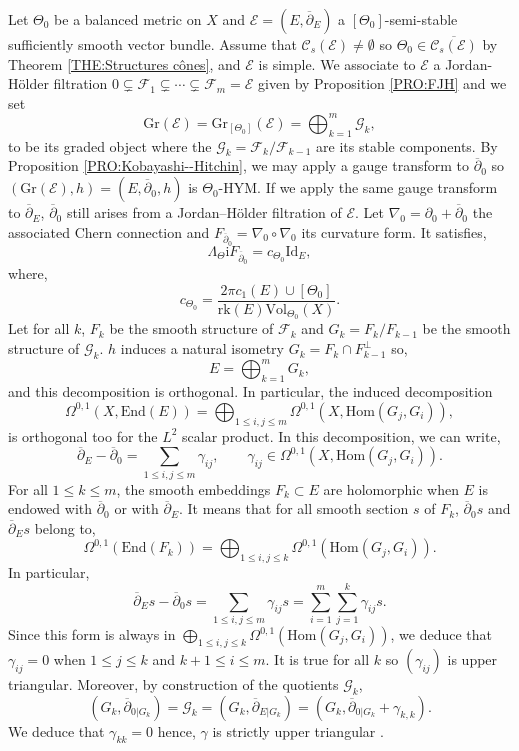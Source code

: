 \documentclass{article}
\theoremstyle{remark}
\theoremstyle{definition}
\newcommand{\rk}{\mathrm{rk}}
\newcommand{\Hom}{\mathrm{Hom}}
\newcommand{\End}{\mathrm{End}}
\newcommand{\Vol}{\mathrm{Vol}}
\newcommand{\Id}{\mathrm{Id}}
\renewcommand{\i}{\boldsymbol{\mathrm{i}}}
\newcommand{\E}{\mathcal{E}}
\newcommand{\F}{\mathcal{F}}
\newcommand{\G}{\mathcal{G}}
\newcommand{\Gr}{\mathrm{Gr}}
\newcommand{\dbar}{\overline{\partial}}
\newcommand{\mC}{\mathcal{C}}
\renewcommand{\leq}{\leqslant}
\begin{document}
Let $\Theta_0$ be a balanced metric on $X$ and $\E = (E,\dbar_E)$ a $[\Theta_0]$-semi-stable sufficiently smooth vector bundle. Assume that $\mC_s(\E) \neq \emptyset$ so $\Theta_0 \in \overline{\mC_s(\E)}$ by Theorem \ref{THE:Structures cônes}, and $\E$ is simple. We associate to $\E$ a Jordan-Hölder filtration $0 \subsetneq \F_1 \subsetneq \cdots \subsetneq \F_m = \E$ given by Proposition \ref{PRO:FJH} and we set
$$
\Gr(\E) = \Gr_{[\Theta_0]}(\E) = \bigoplus_{k = 1}^m \G_k,
$$
to be its graded object where the $\G_k = \F_k/\F_{k - 1}$ are its stable components. By Proposition \ref{PRO:Kobayashi--Hitchin}, we may apply a gauge transform to $\dbar_0$ so $(\Gr(\E),h) = (E,\dbar_0,h)$ is $\Theta_0$-HYM. If we apply the same gauge transform to $\dbar_E$, $\dbar_0$ still arises from a Jordan--Hölder filtration of $\E$. Let $\nabla_0 = \partial_0 + \dbar_0$ the associated Chern connection and $F_{\dbar_0} = \nabla_0 \circ \nabla_0$ its curvature form. It satisfies,
\begin{equation}\label{EQ:dbar_0 HYM}
    \Lambda_\Theta\i F_{\dbar_0} = c_{\Theta_0}\Id_E,
\end{equation}
where,
$$
c_{\Theta_0} = \frac{2\pi c_1(E) \cup [\Theta_0]}{\rk(E)\Vol_{\Theta_0}(X)}.
$$
Let for all $k$, $F_k$ be the smooth structure of $\F_k$ and $G_k = F_k/F_{k - 1}$ be the smooth structure of $\G_k$. $h$ induces a natural isometry $G_k = F_k \cap F_{k - 1}^\bot$ so,
$$
E = \bigoplus_{k = 1}^m G_k,
$$
and this decomposition is orthogonal. In particular, the induced decomposition
$$
\Omega^{0,1}(X,\End(E)) = \bigoplus_{1 \leq i,j \leq m} \Omega^{0,1}(X,\Hom(G_j,G_i)),
$$
is orthogonal too for the $L^2$ scalar product. In this decomposition, we can write,
$$
\dbar_E - \dbar_0 = \sum_{1 \leq i,j \leq m} \gamma_{ij}, \qquad \gamma_{ij} \in \Omega^{0,1}(X,\Hom(G_j,G_i)).
$$
For all $1 \leq k \leq m$, the smooth embeddings $F_k \subset E$ are holomorphic when $E$ is endowed with $\dbar_0$ or with $\dbar_E$. It means that for all smooth section $s$ of $F_k$, $\dbar_0s$ and $\dbar_Es$ belong to,
$$
\Omega^{0,1}(\End(F_k)) = \bigoplus_{1 \leq i,j \leq k} \Omega^{0,1}(\Hom(G_j,G_i)).
$$
In particular,
$$
\dbar_Es - \dbar_0s = \sum_{1 \leq i,j \leq m} \gamma_{ij}s = \sum_{i = 1}^m\sum_{j = 1}^k \gamma_{ij}s.
$$
Since this form is always in $\bigoplus_{1 \leq i,j \leq k} \Omega^{0,1}(\Hom(G_j,G_i))$, we deduce that $\gamma_{ij} = 0$ when $1 \leq j \leq k$ and $k + 1 \leq i \leq m$. It is true for all $k$ so $(\gamma_{ij})$ is upper triangular. Moreover, by construction of the quotients $\G_k$,
$$
(G_k,\dbar_{0|G_k}) = \G_k = (G_k,\dbar_{E|G_k}) = (G_k,\dbar_{0|G_k} + \gamma_{k,k}).
$$
We deduce that $\gamma_{kk} = 0$ hence, $\gamma$ is strictly upper triangular \cite[Sub-section 3.2]{Clarke_Tipler} \cite[Sub-section 4.3.1]{DMS}.
\end{document}
